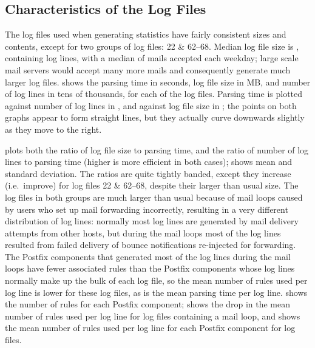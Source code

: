\subsection{Characteristics of the \numberOFlogFILES{} Log Files}

\label{Characteristics of the 93 log files}

The \numberOFlogFILES{} log files used when generating statistics have
fairly consistent sizes and contents, except for two groups of log files:
22 \& 62--68.  Median log file size is
, containing
 log lines, with a median
of  mails accepted
each weekday; large scale mail servers would accept many more mails and
consequently generate much larger log files.   shows the parsing time in seconds,
log file size in MB, and number of log lines in tens of thousands, for each
of the \numberOFlogFILES{} log files.  Parsing time is plotted against
number of log lines in , and against log file size in ; the points on both graphs appear to form straight lines,
but they actually curve downwards slightly as they move to the right.

plots both the ratio of log file size to parsing time, and the ratio of
number of log lines to parsing time (higher is more efficient in both
cases);  shows mean and standard deviation.  The ratios are quite
tightly banded, except they increase (i.e.\ improve) for log files 22 \&
62--68, despite their larger than usual size.  The log files in both groups
are much larger than usual because of mail loops caused by users who set up
mail forwarding incorrectly, resulting in a very different distribution of
log lines: normally most log lines are generated by mail delivery attempts
from other hosts, but during the mail loops most of the log lines resulted
from failed delivery of bounce notifications re-injected for forwarding.
The Postfix components that generated most of the log lines during the mail
loops have fewer associated rules than the Postfix components whose log
lines normally make up the bulk of each log file, so the mean number of
rules used per log line is lower for these log files, as is the mean
parsing time per log line.   shows the number of rules for each Postfix component;
 shows the drop in the
mean number of rules used per log line for log files containing a mail
loop, and  shows the mean number of rules used per log line for each
Postfix component for \numberOFlogFILES{} log files.

